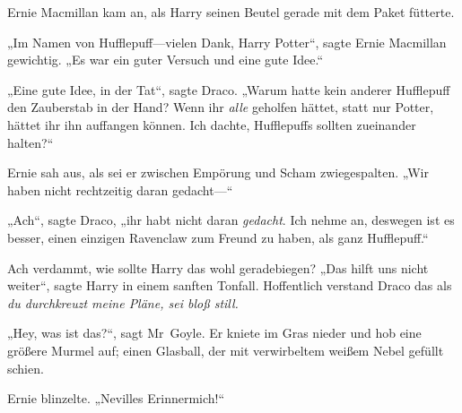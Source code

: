Ernie Macmillan kam an, als Harry seinen Beutel gerade mit dem Paket fütterte.

„Im Namen von Hufflepuff—vielen Dank, Harry Potter“, sagte Ernie Macmillan gewichtig. „Es war ein guter Versuch und eine gute Idee.“

„Eine gute Idee, in der Tat“, sagte Draco. „Warum hatte kein anderer Hufflepuff den Zauberstab in der Hand? Wenn ihr \emph{alle} geholfen hättet, statt nur Potter, hättet ihr ihn auffangen können. Ich dachte, Hufflepuffs sollten zueinander halten?“

Ernie sah aus, als sei er zwischen Empörung und Scham zwiegespalten. „Wir haben nicht rechtzeitig daran gedacht—“

„Ach“, sagte Draco, „ihr habt nicht daran \emph{gedacht}. Ich nehme an, deswegen ist es besser, einen einzigen Ravenclaw zum Freund zu haben, als ganz Hufflepuff.“

Ach verdammt, wie sollte Harry das wohl geradebiegen? „Das hilft uns nicht weiter“, sagte Harry in einem sanften Tonfall. Hoffentlich verstand Draco das als \emph{du durchkreuzt meine Pläne, sei bloß still.}

„Hey, was ist das?“, sagt Mr~Goyle. Er kniete im Gras nieder und hob eine größere Murmel auf; einen Glasball, der mit verwirbeltem weißem Nebel gefüllt schien.

Ernie blinzelte. „Nevilles Erinnermich!“


